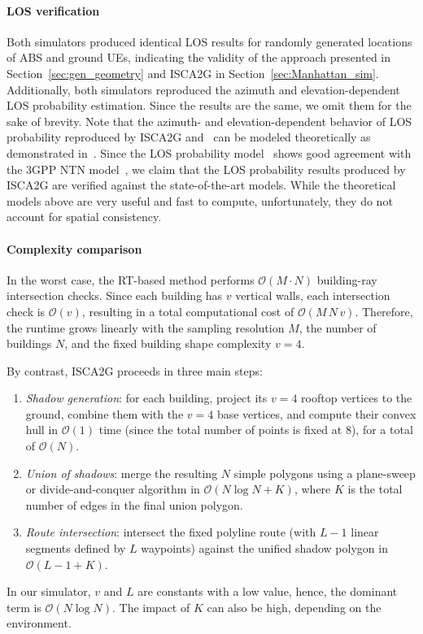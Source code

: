 \documentclass[10pt,conference]{IEEEtran}
\begin{document}
\paragraph{LOS verification} Both simulators produced identical LOS results for randomly generated locations of ABS and ground UEs, indicating the validity of the approach presented in Section~\ref{sec:gen_geometry} and ISCA2G in Section~\ref{sec:Manhattan_sim}. Additionally, both simulators reproduced the azimuth and elevation-dependent LOS probability estimation. Since the results are the same, we omit them for the sake of brevity. Note that the azimuth- and elevation-dependent behavior of LOS probability reproduced by ISCA2G and~\cite{Saboor2023simulator} can be modeled theoretically as demonstrated in~\cite{Saboor2024model,Saboor2025pedestrian}. Since the LOS probability model~\cite{Saboor2024model} shows good agreement with the 3GPP NTN model~\cite{3GPPntn}, we claim that the LOS probability results produced by ISCA2G are verified against the state-of-the-art models. While the theoretical models above are very useful and fast to compute, unfortunately, they do not account for spatial consistency. 
\paragraph{Complexity comparison}  
In the worst case, the RT-based method performs $\mathcal{O}(M \cdot N)$ building-ray intersection checks. Since each building has $v$ vertical walls, each intersection check is $\mathcal{O}(v)$, resulting in a total computational cost of $\mathcal{O}(M\,N\,v)$. Therefore, the runtime grows linearly with the sampling resolution $M$, the number of buildings $N$, and the fixed building shape complexity $v=4$.


By contrast, ISCA2G proceeds in three main steps:
\begin{enumerate}
	\item \emph{Shadow generation}: for each building, project its $v=4$ rooftop vertices to the ground, combine them with the $v=4$ base vertices, and compute their convex hull in $\mathcal{O}(1)$ time (since the total number of points is fixed at 8), for a total of $\mathcal{O}(N)$.
	\item \emph{Union of shadows}: merge the resulting $N$ simple polygons using a plane-sweep or divide-and-conquer algorithm in $\mathcal{O}(N \log N + K)$, where $K$ is the total number of edges in the final union polygon.
	\item \emph{Route intersection}: intersect the fixed polyline route (with $L-1$ linear segments defined by $L$ waypoints) against the unified shadow polygon in \(\mathcal{O}(L -1 + K)\).
\end{enumerate}
In our simulator, $v$ and $L$ are constants with a low value, hence, the dominant term is $\mathcal{O}(N \log N)$. The impact of $K$ can also be high, depending on the environment. 
\end{document}

